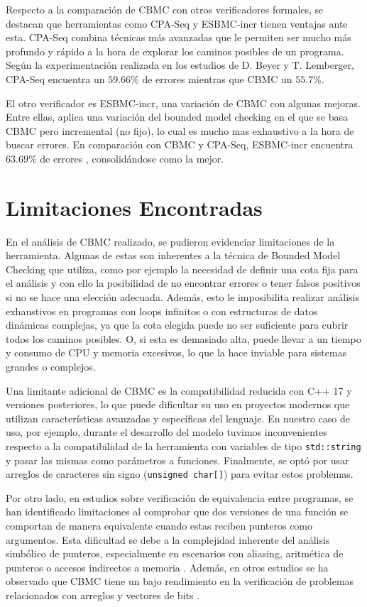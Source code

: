 \documentclass[runningheads]{llncs}
\begin{document}
Respecto a la comparación de CBMC con otros verificadores formales, se destacan que herramientas como CPA-Seq y ESBMC-incr tienen ventajas ante esta.
CPA-Seq combina técnicas más avanzadas que le permiten ser mucho más profundo y rápido a la hora de explorar los caminos posibles de un programa.
Según la experimentación realizada en los estudios de D. Beyer y T. Lemberger, CPA-Seq encuentra un $59.66\%$ de errores mientras que CBMC un $55.7\%$. \cite{cbmc-comparison}

El otro verificador es ESBMC-incr, una variación de CBMC con algunas mejoras.
Entre ellas, aplica una variación del bounded model checking en el que se basa CBMC pero incremental (no fijo), lo cual es mucho mas exhaustivo a la hora de buscar errores.
En comparación con CBMC y CPA-Seq, ESBMC-incr encuentra $63.69\%$ de errores \cite{cbmc-comparison}, consolidándose como la mejor.

%
\section{Limitaciones Encontradas}
En el análisis de CBMC realizado, se pudieron evidenciar limitaciones de la herramienta.
Algunas de estas son inherentes a la técnica de Bounded Model Checking que utiliza, como por ejemplo la necesidad de definir una cota fija para el análisis y 
con ello la posibilidad de no encontrar errores o tener falsos positivos si no se hace una elección adecuada.
Además, esto le imposibilita realizar análisis exhaustivos en programas con loops infinitos o con estructuras de datos dinámicas complejas, ya que 
la cota elegida puede no ser suficiente para cubrir todos los caminos posibles. O, si esta es demasiado alta, puede llevar a un tiempo y consumo de 
CPU y memoria excesivos, lo que la hace inviable para sistemas grandes o complejos.

Una limitante adicional de CBMC es la compatibilidad reducida con C++ 17 y versiones posteriores, lo que puede dificultar su uso en proyectos modernos que utilizan
características avanzadas y específicas del lenguaje. En nuestro caso de uso, por ejemplo, durante el desarrollo del modelo tuvimos inconvenientes respecto a la 
compatibilidad de la herramienta con variables de tipo \verb|std::string| y pasar las mismas como parámetros a funciones. Finalmente, se optó por usar arreglos de 
caracteres sin signo (\verb|unsigned char[]|) para evitar estos problemas.

Por otro lado, en estudios sobre verificación de equivalencia entre programas, se han identificado limitaciones al comprobar que dos versiones de una 
función se comportan de manera equivalente cuando estas reciben punteros como argumentos.
Esta dificultad se debe a la complejidad inherente del análisis simbólico de punteros, especialmente en escenarios con aliasing, aritmética de punteros o 
accesos indirectos a memoria \cite{aes-equivalence-bmc}.
Además, en otros estudios se ha observado que CBMC tiene un bajo rendimiento en la verificación de problemas relacionados con arreglos y vectores de bits \cite{cbmc-comparison}.
\end{document}
